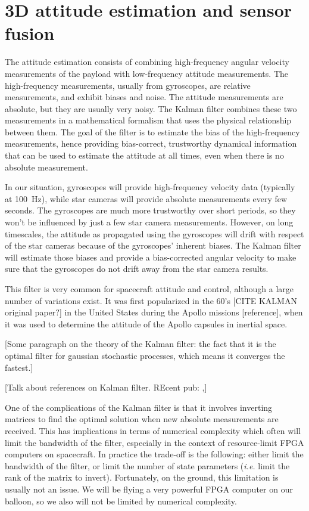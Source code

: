 \section{3D attitude estimation and sensor fusion}
\label{sec:KalmanFilter}
The attitude estimation consists of combining high-frequency angular velocity measurements of the payload with low-frequency attitude measurements. The high-frequency measurements, usually from gyroscopes, are relative measurements, and exhibit biases and noise. The attitude measurements are absolute, but they are usually very noisy. The Kalman filter combines these two measurements in a mathematical formalism that uses the physical relationship between them. The goal of the filter is to estimate the bias of the high-frequency measurements, hence providing bias-correct, trustworthy dynamical information that can be used to estimate the attitude at all times, even when there is no absolute measurement.

In our situation, gyroscopes will provide high-frequency velocity data (typically at 100~Hz), while star cameras will provide absolute measurements every few seconds. The gyroscopes are much more trustworthy over short periods, so they won't be influenced by just a few star camera measurements. However, on long timescales, the attitude as propagated using the gyroscopes will drift with respect of the star cameras because of the gyroscopes' inherent biases. The Kalman filter will estimate those biases and provide a bias-corrected angular velocity to make sure that the gyroscopes do not drift away from the star camera results.

This filter is very common for spacecraft attitude and control, although a large number of variations exist. It was first popularized in the 60's [CITE KALMAN original paper?] in the United States during the Apollo missions [reference], when it was used to determine the attitude of the Apollo capsules in inertial space. 

[Some paragraph on the theory of the Kalman filter: the fact that it is the optimal filter for gaussian stochastic processes, which means it converges the fastest.]

[Talk about references on Kalman filter. REcent pub: \citep{Crassidis:2011ud},\citep{Markley:2014dn}]

One of the complications of the Kalman filter is that it involves inverting matrices to find the optimal solution when new absolute measurements are received. This has implications in terms of numerical complexity which often will limit the bandwidth of the filter, especially in the context of resource-limit FPGA computers on spacecraft. In practice the trade-off is the following: either limit the bandwidth of the filter, or limit the number of state parameters (\textit{i.e.} limit the rank of the matrix to invert). Fortunately, on the ground, this limitation is usually not an issue. We will be flying a very powerful FPGA computer on our balloon, so we also will not be limited by numerical complexity.

